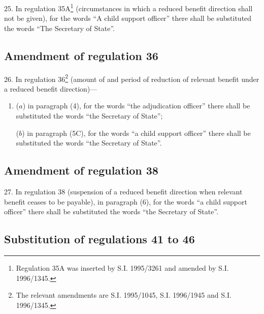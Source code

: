 \documentclass[12pt,a4paper]{article}
\begin{document}
25.  In regulation 35A\footnote{\frenchspacing Regulation 35A was inserted by S.I. 1995/3261 and amended by S.I. 1996/1345.} (circumstances in which a reduced benefit direction shall not be given), for the words “A child support officer” there shall be substituted the words “The Secretary of State”.

\subsection[26. Amendment of regulation 36]{Amendment of regulation 36}

26.  In regulation 36\footnote{\frenchspacing The relevant amendments are S.I. 1995/1045, S.I. 1996/1945 and S.I. 1996/1345.} (amount of and period of reduction of relevant benefit under a reduced benefit direction)---
\begin{enumerate}\item[]
($a$) in paragraph (4), for the words “the adjudication officer” there shall be substituted the words “the Secretary of State”;

($b$) in paragraph (5C), for the words “a child support officer” there shall be substituted the words “the Secretary of State”.
\end{enumerate}

\subsection[27. Amendment of regulation 38]{Amendment of regulation 38}

27.  In regulation 38 (suspension of a reduced benefit direction when relevant benefit ceases to be payable), in paragraph (6), for the words “a child support officer” there shall be substituted the words “the Secretary of State”.

\subsection[28. Substitution of regulations 41 to 46]{Substitution of regulations 41 to 46}
\end{document}

